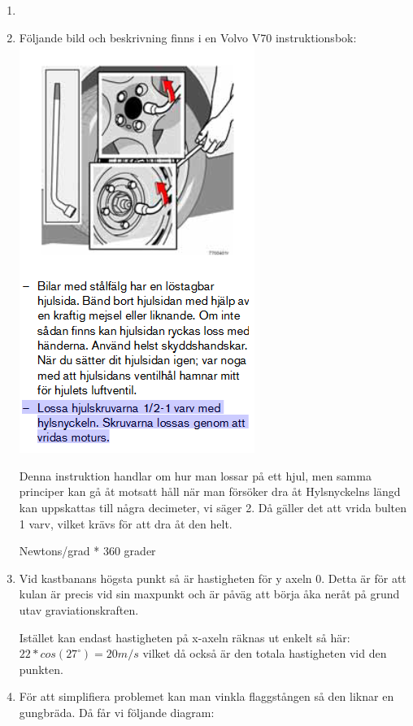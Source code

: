 \documentclass[a4paper,12pt]{article}
\begin{document}
\begin{enumerate}
   \item 

   \item 
   Följande bild och beskrivning finns i en Volvo V70 instruktionsbok:
   \includegraphics{Figur.png}

    Denna instruktion handlar om hur man lossar på ett hjul, men samma principer
    kan gå åt motsatt håll när man försöker dra åt 
    Hylsnyckelns längd kan uppskattas till några decimeter, vi säger 2. Då gäller det att vrida
    bulten 1 varv, vilket krävs för att dra åt den helt. 

    Newtons/grad * 360 grader 


    \item 
    Vid kastbanans högsta punkt så är hastigheten för y axeln 0. Detta är för att
    kulan är precis vid sin maxpunkt och är påväg att börja åka neråt på grund utav
    graviationskraften.

    Istället kan endast hastigheten på x-axeln räknas ut enkelt så här:
    $22*cos(27^\circ)=20 m/s$ vilket då också är den totala hastigheten vid den punkten.

    \item 
    För att simplifiera problemet kan man vinkla flaggstången så den liknar
    en gungbräda. Då får vi följande diagram:
    

\end{enumerate}
\end{document}
